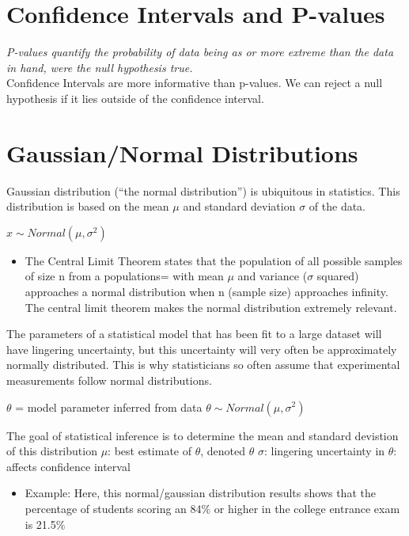\documentclass[]{article}
\providecommand{\tightlist}{%
  \setlength{\itemsep}{0pt}\setlength{\parskip}{0pt}}
\begin{document}
\hypertarget{confidence-intervals-and-p-values}{%
\section{Confidence Intervals and
P-values}\label{confidence-intervals-and-p-values}}

\emph{P-values quantify the probability of data being as or more extreme
than the data in hand, were the null hypothesis true.\\
}Confidence Intervals are more informative than p-values. We can reject
a null hypothesis if it lies outside of the confidence interval.

\hypertarget{gaussiannormal-distributions}{%
\section{Gaussian/Normal
Distributions}\label{gaussiannormal-distributions}}

Gaussian distribution (``the normal distribution'') is ubiquitous in
statistics. This distribution is based on the mean \(\mu\) and standard
deviation \(\sigma\) of the data.

\(x \sim Normal(\mu, \sigma^2)\)

\begin{itemize}
\tightlist
\item
  The Central Limit Theorem states that the population of all possible
  samples of size n from a populations= with mean \(\mu\) and variance
  (\(\sigma\) squared) approaches a normal distribution when n (sample
  size) approaches infinity. The central limit theorem makes the normal
  distribution extremely relevant.
\end{itemize}

The parameters of a statistical model that has been fit to a large
dataset will have lingering uncertainty, but this uncertainty will very
often be approximately normally distributed. This is why statisticians
so often assume that experimental measurements follow normal
distributions.

\(\theta\) = model parameter inferred from data
\(\theta \sim Normal(\mu,σ^2)\)

The goal of statistical inference is to determine the mean and standard
devistion of this distribution \(\mu\): best estimate of \(\theta\),
denoted \(\theta\) \(\sigma\): lingering uncertainty in \(\theta\):
affects confidence interval

\begin{itemize}
\tightlist
\item
  Example: Here, this normal/gaussian distribution results shows that
  the percentage of students scoring an 84\% or higher in the college
  entrance exam is 21.5\%
\end{itemize}
\end{document}
